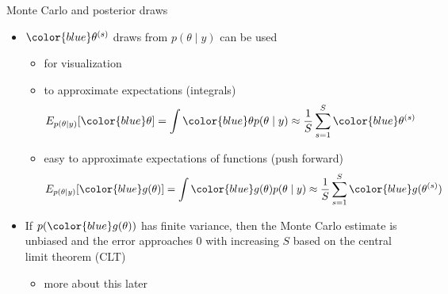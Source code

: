 \documentclass[finnish,english,t]{beamer}
\begin{document}
\begin{frame}{Monte Carlo and posterior draws}
  
  \begin{itemize}
  \item ${\color{blue}\theta^{(s)}}$ draws from $p(\theta \mid y)$ can be used
    \begin{itemize}
    \item<1-> for visualization
    \item<2-> to approximate expectations (integrals)
      \begin{align*}
        E_{p(\theta \mid y)}[{\color{blue}\theta}] = \int {\color{blue}\theta} p(\theta \mid y) \approx \frac{1}{S}\sum_{s=1}^{S} {\color{blue}\theta^{(s)}}
      \end{align*}
    \item<3-> easy to approximate expectations of functions (push forward)
      \begin{align*}
        E_{p(\theta \mid y)}[{\color{blue}g(\theta)}] = \int {\color{blue}g(\theta)} p(\theta \mid y) \approx \frac{1}{S}\sum_{s=1}^{S} {\color{blue}g(\theta^{(s)})}
      \end{align*}
    \end{itemize}
  \item<4-> If $p({\color{blue}g(\theta)})$ has finite variance, then
    the Monte Carlo estimate is unbiased and the error approaches 0
    with increasing $S$ based on the central limit theorem (CLT)
    \begin{itemize}
    \item more about this later
    \end{itemize}
  \end{itemize}

\end{frame}
\end{document}
